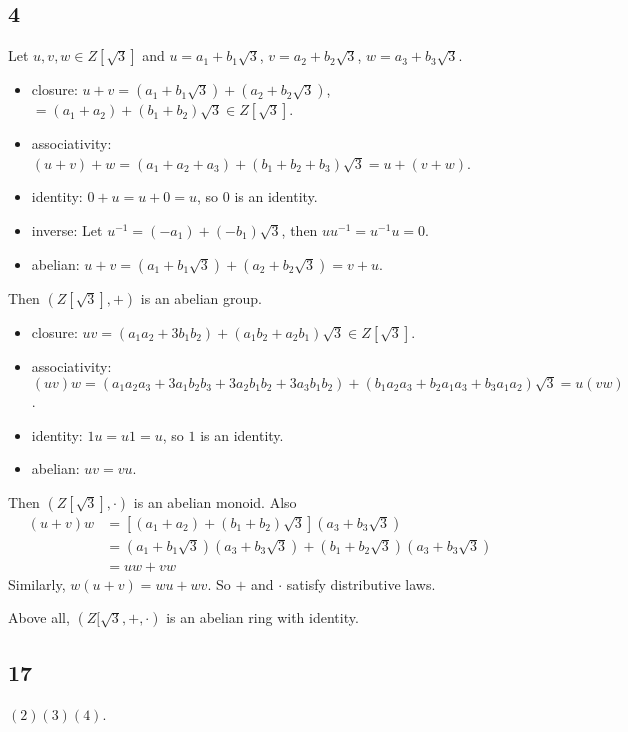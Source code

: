\documentclass[draft]{article}
\begin{document}
		\subsection*{4}
			Let $u, v, w \in Z[\sqrt{3}]$ and $u = a_1 + b_1\sqrt{3}$, $v =
			a_2+b_2\sqrt{3}$, $w = a_3 + b_3\sqrt{3}$.	
			\begin{itemize}
				\item closure:	
					$u + v = (a_1+b_1\sqrt{3}) + (a_2+b_2\sqrt{3})$,$ =
					(a_1+a_2)+(b_1+b_2)\sqrt{3} \in Z[\sqrt{3}]$.
				\item associativity:
					$(u + v) + w = (a_1 + a_2 + a_3) + (b_1 + b_2 + b_3)\sqrt{3} = u + (v
					+ w)$.
				\item identity: 
					$0 + u = u + 0 = u$, so $0$ is an identity.
				\item inverse:
					Let $u^{-1} = (-a_1) + (-b_1)\sqrt{3}$, then $uu^{-1} = u^{-1}u = 0$.
				\item abelian:
					$u+v = (a_1+b_1\sqrt{3}) + (a_2+b_2\sqrt{3}) = v+u$.
			\end{itemize}
			Then $(Z[\sqrt{3}],+)$ is an abelian group.
			\begin{itemize}
				\item closure:
					$uv = (a_1a_2+3b_1b_2) + (a_1b_2+a_2b_1)\sqrt{3} \in Z[\sqrt{3}]$.
				\item associativity:
					$(uv)w =
					(a_1a_2a_3+3a_1b_2b_3+3a_2b_1b_2+3a_3b_1b_2)+(b_1a_2a_3+b_2a_1a_3+b_3a_1a_2)\sqrt{3}
					= u(vw)$.
				\item identity:
					$1u = u1 = u$, so $1$ is an identity.
				\item abelian:
					$uv = vu$.
			\end{itemize}
			Then $(Z[\sqrt{3}],\cdot)$ is an abelian monoid.
			Also
			\begin{equation*}
				\begin{split}
					(u+v)w & = [(a_1+a_2) + (b_1+b_2)\sqrt{3}](a_3+b_3\sqrt{3}) \\
					       & = (a_1+b_1\sqrt{3})(a_3+b_3\sqrt{3}) +
								 (b_1+b_2\sqrt{3})(a_3+b_3\sqrt{3}) \\
								 & = uw+vw
				\end{split}
			\end{equation*}
			Similarly, $w(u+v) = wu + wv$.
			So $+$ and $\cdot$ satisfy distributive laws.

			Above all, $(Z[\sqrt{3},+,\cdot)$ is an abelian ring with identity.
		\subsection*{17}
			$(2)(3)(4)$.
\end{document}
